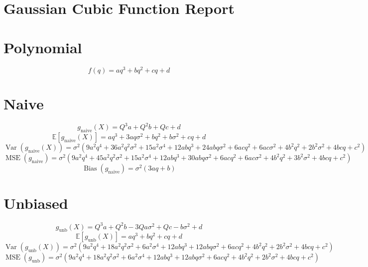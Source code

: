 \documentclass{article}
\begin{document}
\section*{Gaussian Cubic Function Report}
\section*{Polynomial}
\begin{dmath*}
f(q) = a q^{3} + b q^{2} + c q + d
\end{dmath*}
\section*{Naive}
\begin{dmath*}
g_{\mathrm{naive}}(X) = Q^{3} a + Q^{2} b + Q c + d
\end{dmath*}
\begin{dmath*}
\mathbb{E}[g_{\mathrm{naive}}(X)] = a q^{3} + 3 a q \sigma^{2} + b q^{2} + b \sigma^{2} + c q + d
\end{dmath*}
\begin{dmath*}
\operatorname{Var}(g_{\mathrm{naive}}(X)) = \sigma^{2} \left(9 a^{2} q^{4} + 36 a^{2} q^{2} \sigma^{2} + 15 a^{2} \sigma^{4} + 12 a b q^{3} + 24 a b q \sigma^{2} + 6 a c q^{2} + 6 a c \sigma^{2} + 4 b^{2} q^{2} + 2 b^{2} \sigma^{2} + 4 b c q + c^{2}\right)
\end{dmath*}
\begin{dmath*}
\operatorname{MSE}(g_{\mathrm{naive}}) = \sigma^{2} \left(9 a^{2} q^{4} + 45 a^{2} q^{2} \sigma^{2} + 15 a^{2} \sigma^{4} + 12 a b q^{3} + 30 a b q \sigma^{2} + 6 a c q^{2} + 6 a c \sigma^{2} + 4 b^{2} q^{2} + 3 b^{2} \sigma^{2} + 4 b c q + c^{2}\right)
\end{dmath*}
\begin{dmath*}
\operatorname{Bias}(g_{\mathrm{naive}}) = \sigma^{2} \left(3 a q + b\right)
\end{dmath*}
\section*{Unbiased}
\begin{dmath*}
g_{\mathrm{unb}}(X) = Q^{3} a + Q^{2} b - 3 Q a \sigma^{2} + Q c - b \sigma^{2} + d
\end{dmath*}
\begin{dmath*}
\mathbb{E}[g_{\mathrm{unb}}(X)] = a q^{3} + b q^{2} + c q + d
\end{dmath*}
\begin{dmath*}
\operatorname{Var}(g_{\mathrm{unb}}(X)) = \sigma^{2} \left(9 a^{2} q^{4} + 18 a^{2} q^{2} \sigma^{2} + 6 a^{2} \sigma^{4} + 12 a b q^{3} + 12 a b q \sigma^{2} + 6 a c q^{2} + 4 b^{2} q^{2} + 2 b^{2} \sigma^{2} + 4 b c q + c^{2}\right)
\end{dmath*}
\begin{dmath*}
\operatorname{MSE}(g_{\mathrm{unb}}) = \sigma^{2} \left(9 a^{2} q^{4} + 18 a^{2} q^{2} \sigma^{2} + 6 a^{2} \sigma^{4} + 12 a b q^{3} + 12 a b q \sigma^{2} + 6 a c q^{2} + 4 b^{2} q^{2} + 2 b^{2} \sigma^{2} + 4 b c q + c^{2}\right)
\end{dmath*}
\end{document}

